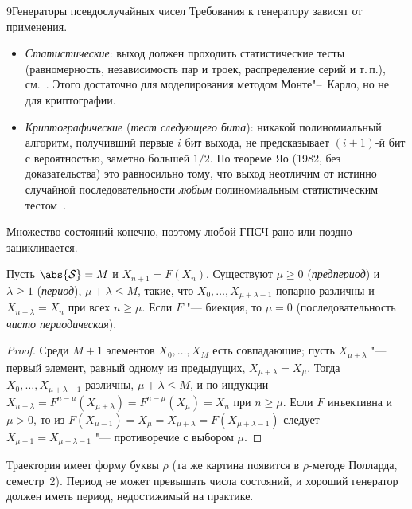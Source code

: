 \begin{lecture}{9}{Генераторы псевдослучайных чисел}
Требования к генератору зависят от применения.
\begin{itemize}
  \item \emph{Статистические}: выход должен проходить статистические тесты (равномерность,
    независимость пар и троек, распределение серий и т.\,п.), см.~\cite[разд.~3.3]{knuth-taocp2}.
    Этого достаточно для моделирования методом Монте"--~Карло, но не для криптографии.
  \item \emph{Криптографические} (\emph{тест следующего бита}): никакой полиномиальный алгоритм,
    получивший первые $i$ бит выхода, не предсказывает $(i+1)$-й бит с вероятностью, заметно
    большей $1/2$. По теореме Яо (1982, без доказательства) это равносильно тому, что выход
    неотличим от истинно случайной последовательности \emph{любым} полиномиальным
    статистическим тестом~\cite[разд.~5.5]{hac}.
\end{itemize}

Множество состояний конечно, поэтому любой ГПСЧ рано или поздно зацикливается.

\begin{proposition}\label{l9:rho}
Пусть $\abs{\mathcal{S}} = M$ и $X_{n+1} = F(X_n)$. Существуют $\mu \ge 0$ (\emph{предпериод}) и
$\lambda \ge 1$ (\emph{период}), $\mu + \lambda \le M$, такие, что $X_0, \dots, X_{\mu + \lambda - 1}$
попарно различны и $X_{n + \lambda} = X_n$ при всех $n \ge \mu$. Если $F$ "--- биекция, то $\mu = 0$
(последовательность \emph{чисто периодическая}).
\end{proposition}

\begin{proof}
Среди $M + 1$ элементов $X_0, \dots, X_M$ есть совпадающие; пусть $X_{\mu + \lambda}$ "--- первый
элемент, равный одному из предыдущих, $X_{\mu + \lambda} = X_\mu$. Тогда $X_0, \dots,
X_{\mu + \lambda - 1}$ различны, $\mu + \lambda \le M$, и по индукции
$X_{n + \lambda} = F^{n - \mu}(X_{\mu + \lambda}) = F^{n - \mu}(X_\mu) = X_n$ при $n \ge \mu$.
Если $F$ инъективна и $\mu > 0$, то из $F(X_{\mu - 1}) = X_\mu = X_{\mu + \lambda} =
F(X_{\mu + \lambda - 1})$ следует $X_{\mu - 1} = X_{\mu + \lambda - 1}$ "--- противоречие
с выбором $\mu$.
\end{proof}

\begin{center}
\end{center}
Траектория имеет форму буквы $\rho$ (та же картина появится в $\rho$-методе Полларда, семестр~2).
Период не может превышать числа состояний, и хороший генератор должен иметь период, недостижимый
на практике.


\end{lecture}
